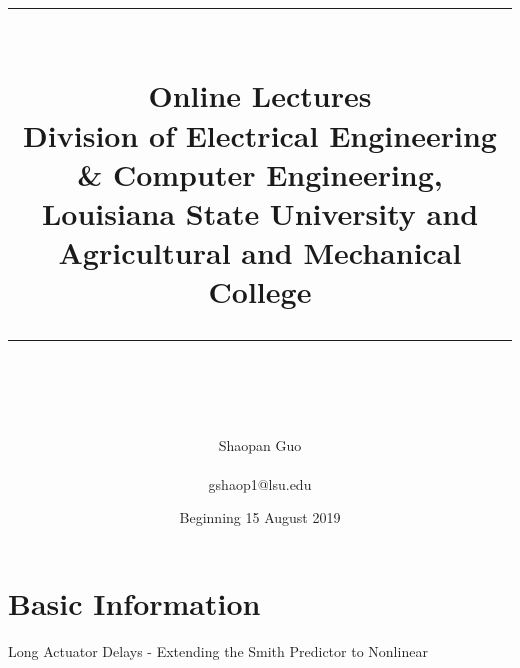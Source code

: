 \documentclass[idxtotoc,hyperref,openany]{labbook} %
\newcommand{\HRule}{\rule{\linewidth}{0.5mm}} %
\begin{document}

\frontmatter %
\title{
\begin{center}
\HRule \\[0.4cm]
{\Huge \bfseries Online Lectures \\[0.5cm] \Large Division of Electrical Engineering & Computer Engineering, Louisiana State University and Agricultural and Mechanical College
}\\[0.4cm] %
\HRule \\[1.5cm]
\end{center}
}
\author{\Huge Shaopan Guo \\ \\ \LARGE gshaop1@lsu.edu \\[2cm]} %
\date{Beginning 15 August 2019} %
\maketitle

\tableofcontents

\mainmatter %











\section{Basic Information}

Long Actuator Delays - Extending the Smith Predictor to Nonlinear
\end{document}
